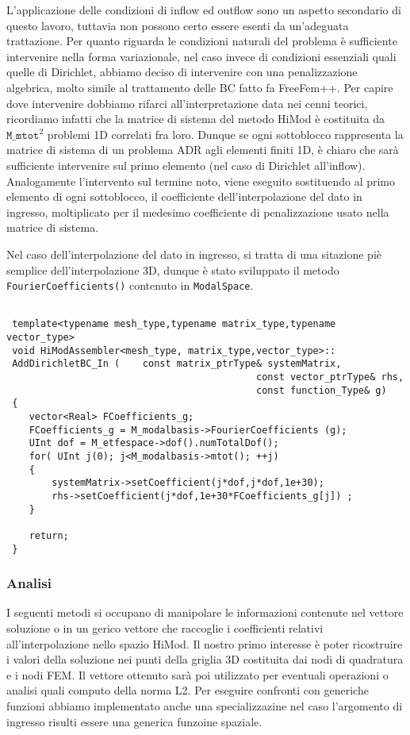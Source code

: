 L'applicazione delle condizioni di inflow ed outflow sono un aspetto secondario di questo lavoro, tuttavia non possono certo essere esenti da un'adeguata trattazione. Per quanto riguarda le condizioni naturali del problema \`e sufficiente intervenire nella forma variazionale, nel caso invece di condizioni essenziali quali quelle di Dirichlet, abbiamo deciso di intervenire con una penalizzazione algebrica, molto simile al trattamento delle BC fatto fa FreeFem++. Per capire dove intervenire dobbiamo rifarci all'interpretazione data nei cenni teorici, ricordiamo infatti che la matrice di sistema del metodo HiMod \`e costituita da $\texttt{M\_mtot}^2$ problemi 1D correlati fra loro. Dunque se ogni sottoblocco rappresenta la matrice di sistema di un problema ADR agli elementi finiti 1D, \`e chiaro che sar\`a sufficiente intervenire sul primo elemento (nel caso di Dirichlet all'inflow). Analogamente l'intervento sul termine noto, viene eseguito sostituendo al primo elemento di ogni sottoblocco, il coefficiente dell'interpolazione del dato in ingresso, moltiplicato per il medesimo coefficiente di penalizzazione usato nella matrice di sistema.

Nel caso dell'interpolazione del dato in ingresso, si tratta di una sitazione pi\`e semplice dell'interpolazione 3D, dunque \`e stato sviluppato il metodo \texttt{FourierCoefficients()} contenuto in \texttt{ModalSpace}.
\begin{lstlisting}[style = general]

 template<typename mesh_type,typename matrix_type,typename vector_type>
 void HiModAssembler<mesh_type, matrix_type,vector_type>::
 AddDirichletBC_In (	const matrix_ptrType& systemMatrix,
 											const vector_ptrType& rhs,
 											const function_Type& g)
 {
 	vector<Real> FCoefficients_g;
 	FCoefficients_g = M_modalbasis->FourierCoefficients (g);
 	UInt dof = M_etfespace->dof().numTotalDof();
 	for( UInt j(0); j<M_modalbasis->mtot(); ++j)
 	{
		systemMatrix->setCoefficient(j*dof,j*dof,1e+30);
		rhs->setCoefficient(j*dof,1e+30*FCoefficients_g[j]) ;
 	}
 	
 	return;
 }
\end{lstlisting}

\subsubsection{Analisi}

I seguenti metodi si occupano di manipolare le informazioni contenute nel vettore soluzione o in un gerico vettore che raccoglie i coefficienti relativi all'interpolazione nello spazio HiMod. Il nostro primo interesse \`e poter ricostruire i valori della soluzione nei punti della griglia 3D costituita dai nodi di quadratura e i nodi FEM. Il vettore ottenuto sar\`a poi utilizzato per eventuali operazioni o analisi quali computo della norma L2.
Per eseguire confronti con generiche funzioni abbiamo implementato anche una specializzazine nel caso l'argomento di ingresso risulti essere una generica funzoine spaziale.

